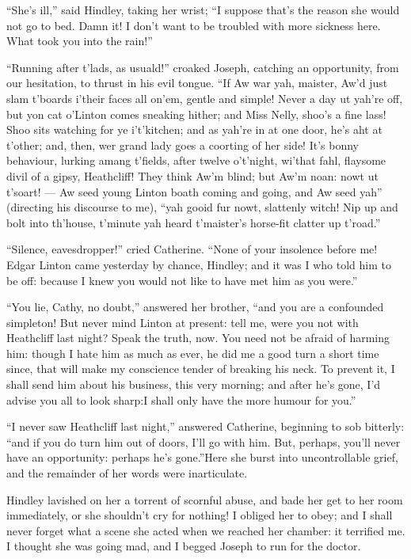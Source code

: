 \par “She's ill,” said Hindley, taking her wrist; “I suppose that's the reason she would not go to bed. Damn it! I don't want to be troubled with more sickness here. What took you into the rain!”
\par “Running after t'lads, as usuald!” croaked Joseph, catching an opportunity, from our hesitation, to thrust in his evil tongue. “If Aw war yah, maister, Aw'd just slam t'boards i'their faces all on'em, gentle and simple! Never a day ut yah're off, but yon cat o'Linton comes sneaking hither; and Miss Nelly, shoo's a fine lass! Shoo sits watching for ye i't'kitchen; and as yah're in at one door, he's aht at t'other; and, then, wer grand lady goes a coorting of her side! It's bonny behaviour, lurking amang t'fields, after twelve o't'night, wi'that fahl, flaysome divil of a gipsy, Heathcliff! They think Aw'm blind; but Aw'm noan: nowt ut t'soart! — Aw seed young Linton boath coming and going, and Aw seed yah” (directing his discourse to me), “yah gooid fur nowt, slattenly witch! Nip up and bolt into th'house, t'minute yah heard t'maister's horse-fit clatter up t'road.”
\par “Silence, eavesdropper!” cried Catherine. “None of your insolence before me! Edgar Linton came yesterday by chance, Hindley; and it was I who told him to be off: because I knew you would not like to have met him as you were.”
\par “You lie, Cathy, no doubt,” answered her brother, “and you are a confounded simpleton! But never mind Linton at present: tell me, were you not with Heathcliff last night? Speak the truth, now. You need not be afraid of harming him: though I hate him as much as ever, he did me a good turn a short time since, that will make my conscience tender of breaking his neck. To prevent it, I shall send him about his business, this very morning; and after he's gone, I'd advise you all to look sharp:I shall only have the more humour for you.”
\par “I never saw Heathcliff last night,” answered Catherine, beginning to sob bitterly: “and if you do turn him out of doors, I'll go with him. But, perhaps, you'll never have an opportunity: perhaps he's gone.”Here she burst into uncontrollable grief, and the remainder of her words were inarticulate.
\par Hindley lavished on her a torrent of scornful abuse, and bade her get to her room immediately, or she shouldn't cry for nothing! I obliged her to obey; and I shall never forget what a scene she acted when we reached her chamber: it terrified me. I thought she was going mad, and I begged Joseph to run for the doctor.
